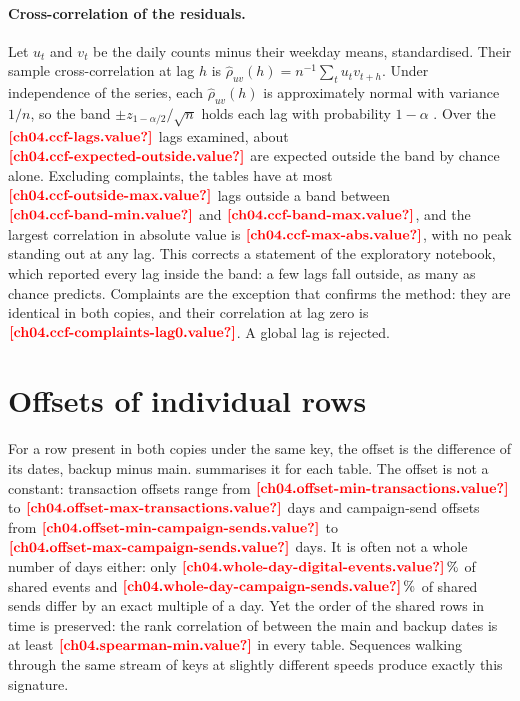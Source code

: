 \paragraph{Cross-correlation of the residuals.} Let $u_t$ and $v_t$ be the daily counts minus their weekday means,
standardised. Their sample cross-correlation at lag $h$ is $\hat\rho_{uv}(h) = n^{-1} \sum_t u_t v_{t+h}$. Under
independence of the series, each $\hat\rho_{uv}(h)$ is approximately normal with variance $1/n$, so the band
$\pm z_{1-\alpha/2}/\sqrt{n}$ holds each lag with probability $1 - \alpha$ \autocite{brockwell1991}. Over the
$\est{ch04.ccf-lags}{value}$ lags examined, about $\est{ch04.ccf-expected-outside}{value}$ are expected outside the
band by chance alone. Excluding complaints, the tables have at most $\est{ch04.ccf-outside-max}{value}$ lags outside a
band between $\est{ch04.ccf-band-min}{value}$ and $\est{ch04.ccf-band-max}{value}$, and the largest correlation in
absolute value is $\est{ch04.ccf-max-abs}{value}$, with no peak standing out at any lag. This corrects a statement of the
exploratory notebook, which reported every lag inside the band: a few lags fall outside, as many as chance predicts.
Complaints are the exception that confirms the method: they are identical in both copies, and their correlation at
lag zero is $\est{ch04.ccf-complaints-lag0}{value}$. A global lag is rejected.



\section{Offsets of individual rows}\label{sec:time-rows}

For a row present in both copies under the same key, the offset is the difference of its dates, backup minus main.
 summarises it for each table. The offset is not a constant: transaction offsets range from
$\est{ch04.offset-min-transactions}{value}$ to $\est{ch04.offset-max-transactions}{value}$ days and campaign-send
offsets from $\est{ch04.offset-min-campaign-sends}{value}$ to $\est{ch04.offset-max-campaign-sends}{value}$ days. It is
often not a whole number of days either: only $\est{ch04.whole-day-digital-events}{value}\,\%$ of shared events and
$\est{ch04.whole-day-campaign-sends}{value}\,\%$ of shared sends differ by an exact multiple of a day. Yet the order of
the shared rows in time is preserved: the rank correlation of \textcite{spearman1904} between the main and backup
dates is at least $\est{ch04.spearman-min}{value}$ in every table. Sequences walking through the same stream of
keys at slightly different speeds produce exactly this signature.

